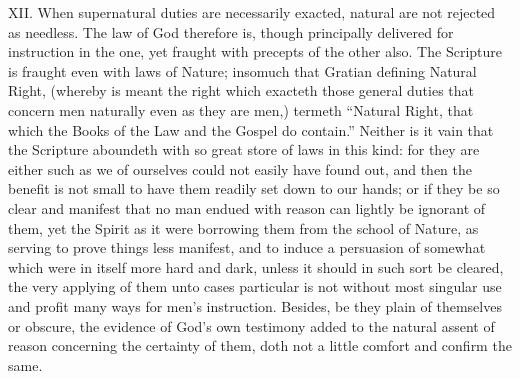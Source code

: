 XII. When supernatural duties are necessarily exacted, natural are not rejected as needless. The law of God therefore is, though principally delivered for instruction in the one, yet fraught with precepts of the other also. The Scripture is fraught even with laws of Nature; insomuch that Gratian defining Natural Right, (whereby is meant the right which exacteth those general duties that concern men naturally even as they are men,) termeth “Natural Right, that which the Books of the Law and the Gospel do contain.” Neither is it vain that the Scripture aboundeth with so great store of laws in this kind: for they are either such as we of ourselves could not easily have found out, and then the benefit is not small to have them readily set down to our hands; or if they be so clear and manifest that no man endued with reason can lightly be ignorant of them, yet the Spirit as it were borrowing them from the school of Nature, as serving to prove things less manifest, and to induce a persuasion of somewhat which were in itself more hard and dark, unless it should in such sort be cleared, the very applying of them unto cases particular is not without most singular use and profit many ways for men’s instruction. Besides, be they plain of themselves or obscure, the evidence of God’s own testimony added to the natural assent of reason concerning the certainty of them, doth not a little comfort and confirm the same.


